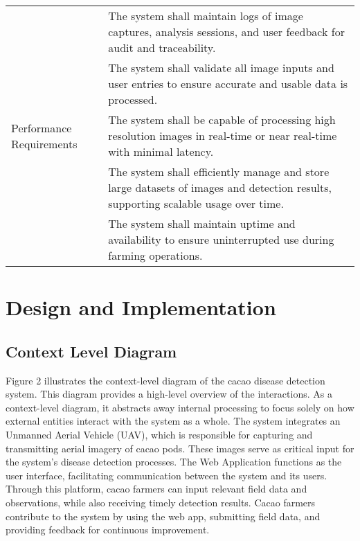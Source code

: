 \begin{table}[h!]
\begin{tabular}{ll}
			  & The system shall maintain logs of image captures, analysis sessions, and user feedback for audit and traceability. \\
			  & The system shall validate all image inputs and user entries to ensure accurate and usable data is processed. \\
			 \midrule
			 Performance Requirements & The system shall be capable of processing high resolution images in real-time or near real-time with minimal latency. \\
			  & The system shall efficiently manage and store large datasets of images and detection results, supporting scalable usage over time. \\
			  & The system shall maintain uptime and availability to ensure uninterrupted use during farming operations. \\
			\bottomrule
		\end{tabular}
	\end{table}
	
	
	\section{Design and Implementation} 
	
	\subsection{Context Level Diagram}
	
	Figure 2 illustrates the context-level diagram of the cacao disease detection system. This diagram provides a high-level overview of the interactions. As a context-level diagram, it abstracts away internal processing to focus solely on how external entities interact with the system as a whole. The system integrates an Unmanned Aerial Vehicle (UAV), which is responsible for capturing and transmitting aerial imagery of cacao pods. These images serve as critical input for the system’s disease detection processes. The Web Application functions as the user interface, facilitating communication between the system and its users. Through this platform, cacao farmers can input relevant field data and observations, while also receiving timely detection results. Cacao farmers contribute to the system by using the web app, submitting field data, and providing feedback for continuous improvement.
	
